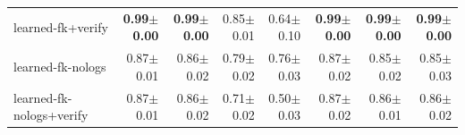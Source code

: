 \begin{table}[t]
\begin{tabular}{lrrrrrrr}
    learned-fk+verify & \textbf{0.99{\scriptsize$\pm$0.00}} & \textbf{0.99{\scriptsize$\pm$0.00}} & 0.85{\scriptsize$\pm$0.01} & 0.64{\scriptsize$\pm$0.10} & \textbf{0.99{\scriptsize$\pm$0.00}} & \textbf{0.99{\scriptsize$\pm$0.00}} & \textbf{0.99{\scriptsize$\pm$0.00}} \\
    learned-fk-nologs & 0.87{\scriptsize$\pm$0.01} & 0.86{\scriptsize$\pm$0.02} & 0.79{\scriptsize$\pm$0.02} & 0.76{\scriptsize$\pm$0.03} & 0.87{\scriptsize$\pm$0.02} & 0.85{\scriptsize$\pm$0.02} & 0.85{\scriptsize$\pm$0.03} \\
    learned-fk-nologs+verify & 0.87{\scriptsize$\pm$0.01} & 0.86{\scriptsize$\pm$0.02} & 0.71{\scriptsize$\pm$0.02} & 0.50{\scriptsize$\pm$0.03} & 0.87{\scriptsize$\pm$0.02} & 0.86{\scriptsize$\pm$0.01} & 0.86{\scriptsize$\pm$0.02} \\
    \bottomrule
  \end{tabular}
\end{table}

